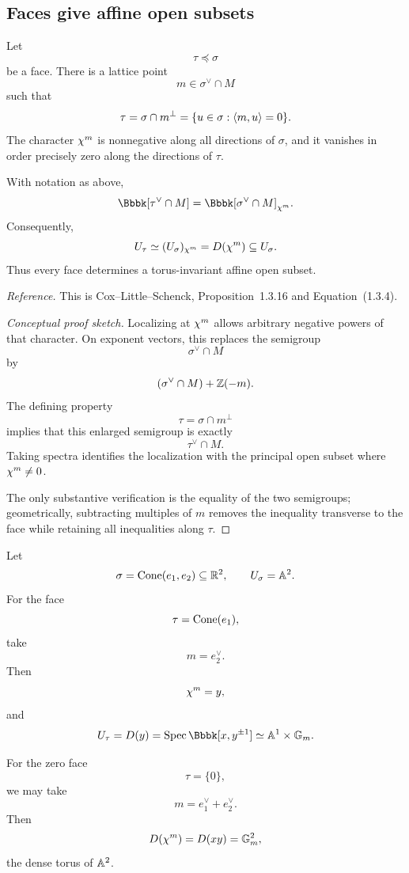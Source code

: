 \subsection{Faces give affine open subsets}

Let
\[
\tau\preceq\sigma
\]
be a face. There is a lattice point
\[
m\in\sigma^\vee\cap M
\]
such that
\[
\tau
=
\sigma\cap m^\perp
=
\{u\in\sigma:\left\langle m,u\right\rangle=0\}.
\]
The character \(\chi^{m}\) is nonnegative along all directions
of \(\sigma\), and it vanishes in order precisely zero along the
directions of \(\tau\).

\begin{proposition}
\label{prop:face-localization-affine-toric}
With notation as above,
\[
\Bbbk[\tau^\vee\cap M]
=
\Bbbk[\sigma^\vee\cap M]_{\character{m}}.
\]
Consequently,
\[
U_\tau
\simeq
(U_\sigma)_{\chi^{m}}
=
D(\chi^{m})
\subseteq U_\sigma.
\]
Thus every face determines a torus-invariant affine open subset.
\end{proposition}

\noindent
\textit{Reference.}
This is Cox--Little--Schenck, Proposition~1.3.16 and
Equation~(1.3.4).

\begin{proof}[Conceptual proof sketch]
Localizing at \(\chi^{m}\) allows arbitrary negative powers of
that character. On exponent vectors, this replaces the semigroup
\[
\sigma^\vee\cap M
\]
by
\[
(\sigma^\vee\cap M)+\mathbb{Z}(-m).
\]
The defining property
\[
\tau=\sigma\cap m^\perp
\]
implies that this enlarged semigroup is exactly
\[
\tau^\vee\cap M.
\]
Taking spectra identifies the localization with the principal open
subset where \(\chi^{m}\neq0\).

The only substantive verification is the equality of the two
semigroups; geometrically, subtracting multiples of \(m\) removes the
inequality transverse to the face while retaining all inequalities
along \(\tau\).
\end{proof}

\begin{example}
Let
\[
\sigma=\operatorname{Cone}(e_1,e_2)\subseteq\mathbb{R}^2,
\qquad
U_\sigma=\mathbb{A}^2.
\]
For the face
\[
\tau=\operatorname{Cone}(e_1),
\]
take
\[
m=e_2^\vee.
\]
Then
\[
\chi^{m}=y,
\]
and
\[
U_\tau
=
D(y)
=
\Spec\Bbbk[x,y^{\pm1}]
\simeq
\AAA^1\times\Gm.
\]
\end{example}

\begin{example}
For the zero face
\[
\tau=\{0\},
\]
we may take
\[
m=e_1^\vee+e_2^\vee.
\]
Then
\[
D(\chi^{m})
=
D(xy)
=
\mathbb{G}_{m}^2,
\]
the dense torus of \(\mathbb{A}^2\).
\end{example}

